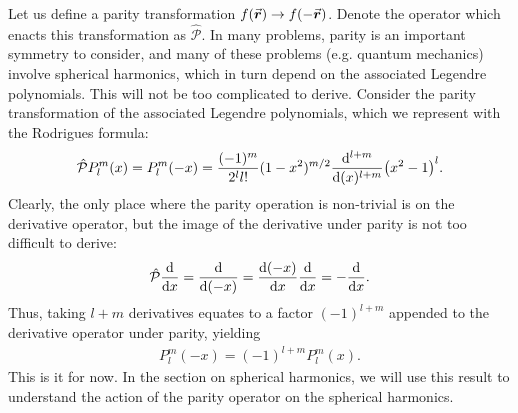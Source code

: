 Let us define a parity transformation $f(\va*{r}) \rightarrow f(-\va*{r})$.
Denote the operator which enacts this transformation as $\hat{\mathcal{P}}$.
In many problems, parity is an important symmetry to consider, and many of these problems (e.g. quantum mechanics) involve spherical harmonics, which in turn depend on the associated Legendre polynomials.
This will not be too complicated to derive.
Consider the parity transformation of the associated Legendre polynomials, which we represent with the Rodrigues formula:
\begin{eqnarray}
    \hat{\mathcal{P}} P_{l}^{m}(x) = P_{l}^{m}(-x) = \frac{(-1)^{m}}{2^{l} l!} (1 - x^2)^{m/2} \dv[l+m]{(x)} (x^2-1)^{l}
.\end{eqnarray}
Clearly, the only place where the parity operation is non-trivial is on the derivative operator, but the image of the derivative under parity is not too difficult to derive:
\begin{eqnarray}
    \hat{\mathcal{P}} \dv{x} = \dv{(-x)} = \dv{(-x)}{x} \dv{x} = -\dv{x}
.\end{eqnarray}
Thus, taking $l+m$ derivatives equates to a factor $(-1)^{l+m}$ appended to the derivative operator under parity, yielding
\begin{eqnarray}
    P_{l}^{m}(-x) = (-1)^{l+m} P_{l}^{m}(x)
.\end{eqnarray}
This is it for now.
In the section on spherical harmonics, we will use this result to understand the action of the parity operator on the spherical harmonics.




